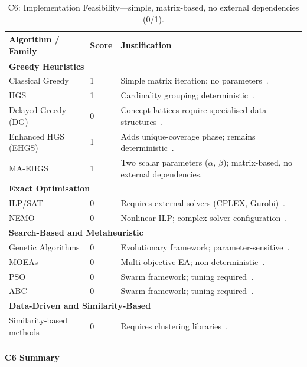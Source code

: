 \begin{appendices}
\begin{table}[H]
  \centering
  \footnotesize
  \caption{C6: Implementation Feasibility—simple, matrix-based, no external dependencies (0/1).}
  \label{tab:app-c6}
  \begin{tabular}{@{}p{4.5cm}p{0.8cm}p{6.9cm}@{}}
    \toprule
    \textbf{Algorithm / Family} & \textbf{Score} & \textbf{Justification} \\
    \midrule
    \multicolumn{3}{l}{\textbf{Greedy Heuristics}} \\
    Classical Greedy & 1 & Simple matrix iteration; no parameters~\cite{harrold1993}. \\
    HGS & 1 & Cardinality grouping; deterministic~\cite{harrold1993}. \\
    Delayed Greedy (DG) & 0 & Concept lattices require specialised data structures~\cite{tallam2005}. \\
    Enhanced HGS (EHGS) & 1 & Adds unique-coverage phase; remains deterministic~\cite{gladston2015}. \\
    MA-EHGS & 1 & Two scalar parameters ($\alpha$, $\beta$); matrix-based, no external dependencies. \\[0.2em]
    \multicolumn{3}{l}{\textbf{Exact Optimisation}} \\
    ILP/SAT & 0 & Requires external solvers (CPLEX, Gurobi)~\cite{elbaum2002,yoo2012}. \\
    NEMO & 0 & Nonlinear ILP; complex solver configuration~\cite{lin2018}. \\[0.2em]
    \multicolumn{3}{l}{\textbf{Search-Based and Metaheuristic}} \\
    Genetic Algorithms & 0 & Evolutionary framework; parameter-sensitive~\cite{yoo2012,khan2020}. \\
    MOEAs & 0 & Multi-objective EA; non-deterministic~\cite{wei2017}. \\
    PSO & 0 & Swarm framework; tuning required~\cite{khan2020}. \\
    ABC & 0 & Swarm framework; tuning required~\cite{khan2020}. \\[0.2em]
    \multicolumn{3}{l}{\textbf{Data-Driven and Similarity-Based}} \\
    Similarity-based methods & 0 & Requires clustering libraries~\cite{bach2017,khan2020}. \\
    \bottomrule
  \end{tabular}
\end{table}

\paragraph*{C6 Summary}


\end{appendices}
